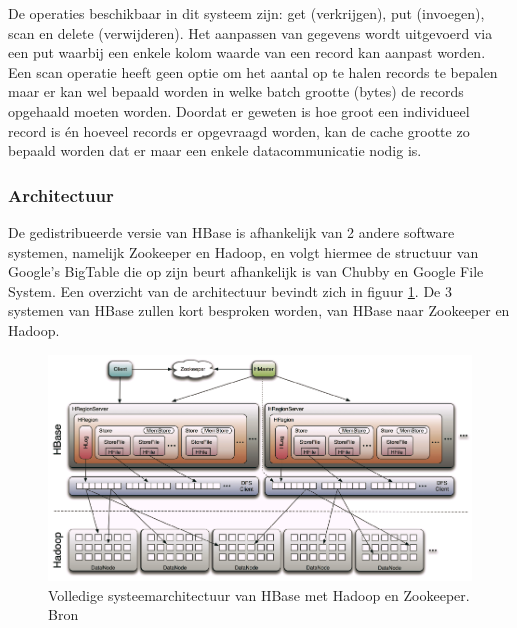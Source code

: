 De operaties beschikbaar in dit systeem zijn: get (verkrijgen), put (invoegen), scan en delete (verwijderen). Het aanpassen van gegevens wordt uitgevoerd via een put waarbij een enkele kolom waarde van een record kan aanpast worden. Een scan operatie heeft geen optie om het aantal op te halen records te bepalen maar er kan wel bepaald worden in welke batch grootte (bytes) de records opgehaald moeten worden. Doordat er geweten is hoe groot een individueel record is én hoeveel records er opgevraagd worden, kan de cache grootte zo bepaald worden dat er maar een enkele datacommunicatie nodig is. 

\subsubsection{Architectuur\cite{george2011hbase}}
De gedistribueerde versie van HBase is afhankelijk van 2 andere software systemen, namelijk Zookeeper\cite{hunt2010zookeeper} en Hadoop\cite{borthakur2007hadoop}, en volgt hiermee de structuur van Google's BigTable\cite{chang2008bigtable} die op zijn beurt afhankelijk is van Chubby\cite{burrows2006chubby} en Google File System\cite{ghemawat2003google}. Een overzicht van de architectuur bevindt zich in figuur \ref{fig:Hbase-structure}. De 3 systemen van HBase zullen kort besproken worden, van HBase naar Zookeeper en Hadoop. 

\begin{figure}[ht!]
\centering
\includegraphics[width=\linewidth]{img/Hbase-structure.png}
\caption{Volledige systeemarchitectuur van HBase met Hadoop en Zookeeper. Bron \cite{ChinHBaseComprehensive}}
\label{fig:Hbase-structure}
\end{figure}

